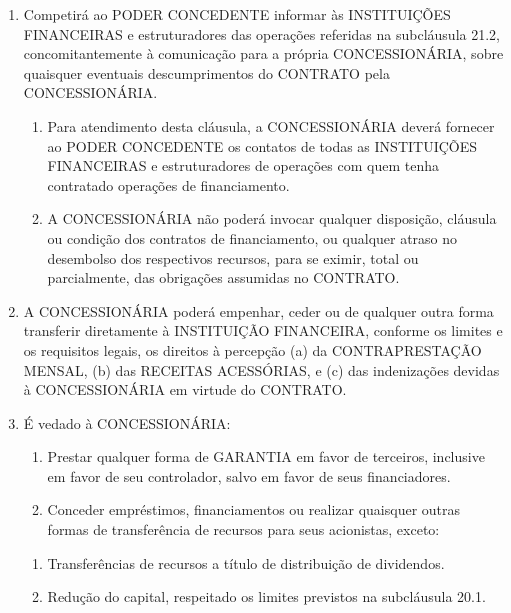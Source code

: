 \documentclass[a4paper,11pt]{report} %
\begin{document}
\begin{enumerate}
\item \label{itm:TDGB}	Competirá ao PODER CONCEDENTE informar às INSTITUIÇÕES FINANCEIRAS e estruturadores das operações referidas na subcláusula 21.2, concomitantemente à comunicação para a própria CONCESSIONÁRIA, sobre quaisquer eventuais descumprimentos do CONTRATO pela CONCESSIONÁRIA.

\begin{enumerate}[label*=\arabic*.]
\item \label{itm:62R4}	Para atendimento desta cláusula, a CONCESSIONÁRIA deverá fornecer ao PODER CONCEDENTE os contatos de todas as INSTITUIÇÕES FINANCEIRAS e estruturadores de operações com quem tenha contratado operações de financiamento.

\item \label{itm:X65A}	A CONCESSIONÁRIA não poderá invocar qualquer disposição, cláusula ou condição dos contratos de financiamento, ou qualquer atraso no desembolso dos respectivos recursos, para se eximir, total ou parcialmente, das obrigações assumidas no CONTRATO.
\end{enumerate}

\item \label{itm:6395}	A CONCESSIONÁRIA poderá empenhar, ceder ou de qualquer outra forma transferir diretamente à INSTITUIÇÃO FINANCEIRA, conforme os limites e os requisitos legais, os direitos à percepção (a) da CONTRAPRESTAÇÃO MENSAL, (b) das RECEITAS ACESSÓRIAS, e (c) das indenizações devidas à CONCESSIONÁRIA em virtude do CONTRATO.

\item \label{itm:CDZH}	É vedado à CONCESSIONÁRIA:

\begin{enumerate}[label*=\arabic*.]
\item \label{itm:8SDB}	Prestar qualquer forma de GARANTIA em favor de terceiros, inclusive em favor de seu controlador, salvo em favor de seus financiadores.

\item \label{itm:89E4}	Conceder empréstimos, financiamentos ou realizar quaisquer outras formas de transferência de recursos para seus acionistas, exceto:
\end{enumerate}

\begin{enumerate}[label*=\arabic*.]
\item \label{itm:BSB6}	Transferências de recursos a título de distribuição de dividendos.

\item \label{itm:K5D9}	Redução do capital, respeitado os limites previstos na subcláusula 20.1.


\end{enumerate}
\end{enumerate}
\end{document}
